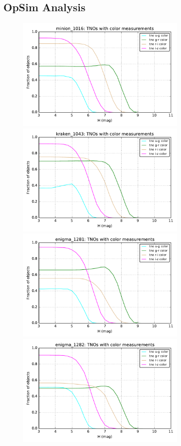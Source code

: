 
\subsection{OpSim Analysis}
\label{sec:\secname:analysis}

\begin{figure}
\includegraphics[width=3.3in]{figs/solarsystem/minion_1016_ColorDetermination_i-z_u-g_r-i_g-r_color_tno_MOOB_ComboMetricVsH}
\includegraphics[width=3.3in]{figs/solarsystem/kraken_1043_ColorDetermination_i-z_u-g_r-i_g-r_color_tno_MOOB_ComboMetricVsH}
\\
\includegraphics[width=3.3in]{figs/solarsystem/enigma_1281_ColorDetermination_i-z_u-g_r-i_g-r_color_tno_MOOB_ComboMetricVsH}
\includegraphics[width=3.3in]{figs/solarsystem/enigma_1282_ColorDetermination_i-z_u-g_r-i_g-r_color_tno_MOOB_ComboMetricVsH} 

\end{figure}
